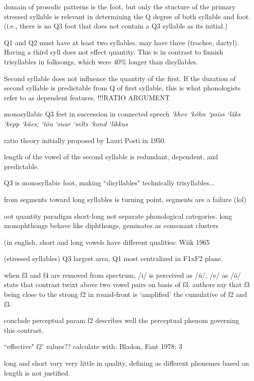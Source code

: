 \par

domain of prosodic patterns is the foot, but only the stucture of the primary stressed syllable is relevant in determining the Q degree of both syllable and foot. (i.e., there is no Q3 foot that does not contain a Q3 syllable as its initial.) 

Q1 and Q2 must have at least two syllables, may have three (trochee, dactyl). Having a third syll does not effect quantity. This is in contrast to finnish trisyllables in folksongs, which were 40\% longer than disyllables. 

Second syllable does not influence the quantity of the first. If the duration of second syllable is predictable from Q of first syllable, this is what phonologists refer to as dependent features. !!!RATIO ARGUMENT

monosyllabic Q3 feet in succession in connected speech {\it `khev `kõhn `poiss `läks `kepp `käes; `tõu `suur `selts `kond `likkus}

ratio theory initially proposed by Lauri Posti in 1950. 

length of the vowel of the second syllable is redundant, dependent, and predictable. 

Q3 is monosyllabic foot, making ``disyllables" technically trisyllables... 

from segments toward long syllables is turning point, segments are a failure (lol) 
\citep{hintUralic98}

oot quantity paradigm
short-long not separate phonological categories. long monophthongs behave like diphthongs, geminates as consonant clusters

(in english, short and long vowels have different qualities: Wiik 1965

(stressed syllables) Q3 largest area, Q1 most centralized in F1xF2 plane. 
\par

when f3 and f4 are removed from spectrum, /i/ is perceived as /ü/, /e/ as /ö/
state that contrast twixt above two vowel pairs on basis of f3. authors say that f3 being close to the strong f2 in round-front is `amplified' the cumulative of f2 and f3.

conclude perceptual param f2 describes well the perceptual phenom governing this contrast. 

``effective" f2' values??
calculate with: Bladon, Fant 1978: 3 

long and short vary very little in quality, defining as different phonemes based on length is not justified. 


